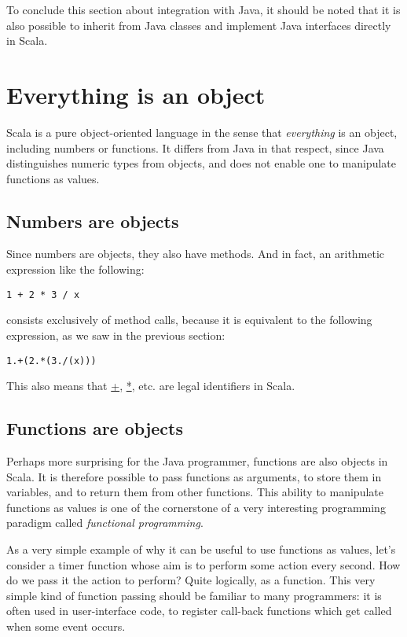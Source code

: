 \documentclass[a4paper,12pt]{article}
\newcommand{\langname}[1]{#1\xspace}
\newcommand{\Scala}{\langname{Scala}}
\newcommand{\Java}{\langname{Java}}
\newcommand{\ident}[1]{\url{#1}\xspace}
\begin{document}
To conclude this section about integration with \Java, it should be
noted that it is also possible to inherit from \Java classes and
implement \Java interfaces directly in \Scala.

\section{Everything is an object}
\label{sec:everything-an-object}

\Scala is a pure object-oriented language in the sense that
\emph{everything} is an object, including numbers or functions. It
differs from \Java in that respect, since \Java distinguishes numeric
types from objects, and does not enable one to manipulate functions as
values.

\subsection{Numbers are objects}
\label{sec:numbers-are-objects}

Since numbers are objects, they also have methods. And in fact, an
arithmetic expression like the following:
\begin{verbatim}
1 + 2 * 3 / x
\end{verbatim}
consists exclusively of method calls, because it is equivalent to the
following expression, as we saw in the previous section:
\begin{verbatim}
1.+(2.*(3./(x)))
\end{verbatim}
This also means that \ident{+}, \ident{*}, etc. are legal identifiers
in \Scala.

\subsection{Functions are objects}
\label{sec:funct-are-objects}

Perhaps more surprising for the \Java programmer, functions are also
objects in \Scala. It is therefore possible to pass functions as
arguments, to store them in variables, and to return them from other
functions. This ability to manipulate functions as values is one of
the cornerstone of a very interesting programming paradigm called
\emph{functional programming}.

As a very simple example of why it can be useful to use functions as
values, let's consider a timer function whose aim is to perform some
action every second. How do we pass it the action to perform? Quite
logically, as a function. This very simple kind of function passing
should be familiar to many programmers: it is often used in
user-interface code, to register call-back functions which get called
when some event occurs.
\end{document}
